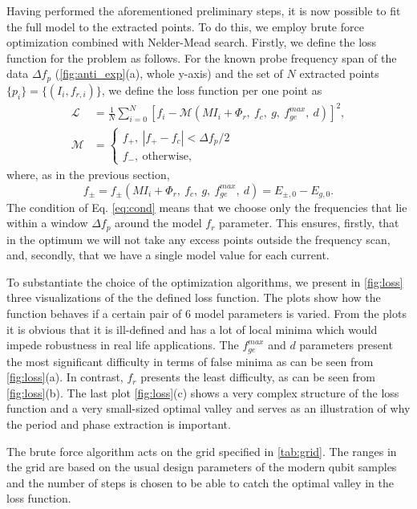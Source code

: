 \documentclass[%
 aip,
 amsmath,amssymb,
 reprint,%
]{revtex4-1}
\begin{document}
 
Having performed the aforementioned preliminary steps, it is now possible to fit the full model to the extracted points. To do this, we employ brute force optimization combined with Nelder-Mead\cite{nelder1965} search. Firstly, we define the loss function for the problem as follows. For the known probe frequency span of the data $\Delta f_p$ (\autoref{fig:anti_exp}(a), whole y-axis) and the set of $N$ extracted points $\{p_i\} = \{(I_i, f_{r,i})\}$, we define the loss function per one point as
\begin{align}
\mathcal{L} &=  \frac{1}{N}\sum_{i=0}^N [f_i - \mathcal{M}(M I_i+\Phi_r,\ f_c,\ g,\ f_{ge}^{max},\ d)]^2,\label{eq:loss}\\
\mathcal{M} &= \begin{cases}
f_+,\  |f_+ - f_c|< \Delta f_p/2 \\
f_-,\ \text{otherwise}, \label{eq:cond}
\end{cases}
\end{align}
where, as in the previous section, $$f_{\pm} = f_{\pm}(M I_i + \Phi_r,\ f_c,\ g,\ f_{ge}^{max},\ d) = E_{\pm, 0} - E_{g,0}.$$
The condition of Eq. \eqref{eq:cond} means that we choose only the frequencies that lie within a window $\Delta f_p$ around the model $f_r$ parameter. This ensures, firstly, that in the optimum we will not take any excess points outside the frequency scan, and, secondly, that we have a single model value for each current.

To substantiate the choice of the optimization algorithms, we present in \autoref{fig:loss} three visualizations of the the defined loss function. The plots show how the function behaves if a certain pair of 6 model parameters is varied. From the plots it is obvious that it is ill-defined and has a lot of local minima which would impede robustness in real life applications. The $f^{max}_{ge}$ and $d$ parameters present the most significant difficulty in terms of false minima as can be seen from \autoref{fig:loss}(a). In contrast, $f_r$ presents the least difficulty, as can be seen from \autoref{fig:loss}(b). The last plot \autoref{fig:loss}(c) shows a very complex structure of the loss function and a very small-sized optimal valley and serves as an illustration of why the period and phase extraction is important.

The brute force algorithm acts on the grid specified in \autoref{tab:grid}. The ranges in the grid are based on the usual design parameters of the modern qubit samples and the number of steps is chosen to be able to catch the optimal valley in the loss function. 
\end{document}
